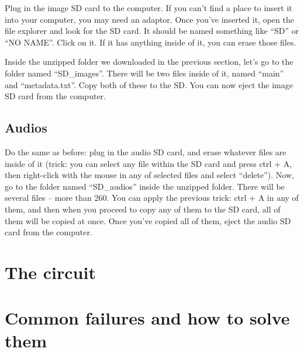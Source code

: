 \documentclass{article}
\begin{document}
Plug in the image SD card to the computer. If you can't find a place to insert it into your computer, you may need an adaptor. Once you've inserted it, open the file explorer and look for the SD card. It should be named something like ``SD'' or ``NO NAME''. Click on it. If it has anything inside of it, you can erase those files.


Inside the unzipped folder we downloaded in the previous section, let's go to the folder named ``SD\_images''. There will be two files inside of it, named ``main'' and ``metadata.txt''. Copy both of these to the SD. You can now eject the image SD card from the computer.

\subsection{Audios}
Do the same as before: plug in the audio SD card, and erase whatever files are inside of it (trick: you can select any file within the SD card and press ctrl + A, then right-click with the mouse in any of selected files and select ``delete''). Now, go to the folder named ``SD\_audios'' inside the unzipped folder. There will be several files -- more than 260. You can apply the previous trick: ctrl + A in any of them, and then when you proceed to copy any of them to the SD card, all of them will be copied at once. Once you've copied all of them, eject the audio SD card from the computer.

\section{The circuit}

\section{Common failures and how to solve them}
\end{document}
